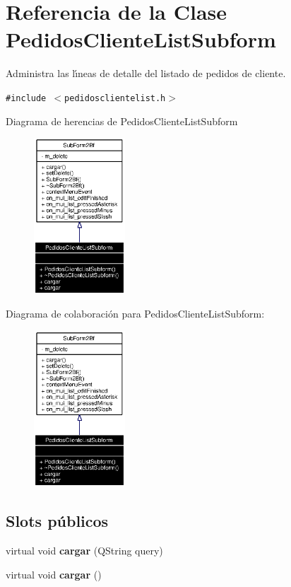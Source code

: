 \section{Referencia de la Clase Pedidos\-Cliente\-List\-Subform}
\label{classPedidosClienteListSubform}
Administra las l\'{\i}neas de detalle del listado de pedidos de cliente.  


{\tt \#include $<$pedidosclientelist.h$>$}

Diagrama de herencias de Pedidos\-Cliente\-List\-Subform\begin{figure}[H]
\begin{center}
\leavevmode
\includegraphics[width=97pt]{classPedidosClienteListSubform__inherit__graph}
\end{center}
\end{figure}
Diagrama de colaboraci\'{o}n para Pedidos\-Cliente\-List\-Subform:\begin{figure}[H]
\begin{center}
\leavevmode
\includegraphics[width=97pt]{classPedidosClienteListSubform__coll__graph}
\end{center}
\end{figure}
\subsection*{Slots p\'{u}blicos}
\begin{CompactItemize}
\item 
virtual void {\bf cargar} (QString query)\label{classPedidosClienteListSubform_i0}

\item 
virtual void {\bf cargar} ()\label{classPedidosClienteListSubform_i1}

\end{CompactItemize}
